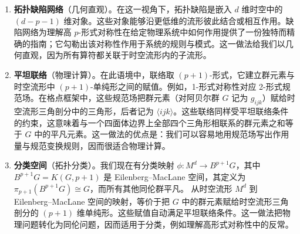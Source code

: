\begin{enumerate}
    \item \textbf{拓扑缺陷网络}（几何直观）。在这一视角下，拓扑缺陷是嵌入 $d$ 维时空中的 $(d-p-1)$ 维对象。这些对象能够沿更低维的流形彼此结合或相互作用。缺陷网络为理解高 $p$-形式对称性在给定物理系统中如何作用提供了一份独特而精确的指南；它勾勒出该对称性作用于系统的规则与模式。这一做法给我们以几何直观，因为所有算符都关联于时空流形内的子流形。

    \item \textbf{平坦联络}（物理计算）。在此语境中，联络取 $(p+1)$-形式，它建立群元素与时空流形中 $(p+1)$-单纯形之间的赋值。例如，1-形式对称性对应 2-形式规范场。在格点框架中，这些规范场把群元素（对阿贝尔群 $G$ 记为 $g_{ijk}$）赋给时空流形三角剖分中的三角形，后者记为 $\langle ijk\rangle$。这些联络同样受平坦联络条件的约束，这意味着与一个四面体边界上全部四个三角形相联系的群元素之和等于 $G$ 中的平凡元素。这一做法的优点是：我们可以容易地用规范场写出作用量与规范变换规则，因而很适合物理计算。
    
    \item \textbf{分类空间}（拓扑分类）。我们现在有分类映射 $\phi: M^d\to B^{p+1}G$，其中 $B^{p+1}G=K(G,p+1)$ 是 Eilenberg–MacLane 空间，其定义为 $\pi_{p+1}(B^{p+1}G) \cong G$，而所有其他同伦群平凡。
从时空流形 $M^d$ 到 Eilenberg–MacLane 空间的映射，等价于把 $G$ 中的群元素赋给时空流形三角剖分的 $(p+1)$ 维单纯形。这些赋值自动满足平坦联络条件。这一做法把物理问题转化为同伦问题，因而适用于分类，例如理解高形式对称性中的反常。
    
    \end{enumerate}
